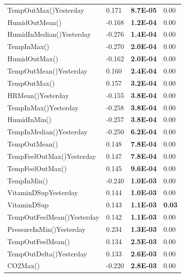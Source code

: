 \documentclass[conference]{IEEEtran}
\begin{document}
\begin{table}[]
\begin{tabular}{llll}
TempOutMax()Yesterday          & 0.171  & \textbf{8.7E-05} & 0.00           \\
HumidOutMean()                 & -0.168 & \textbf{1.2E-04} & 0.00           \\
HumidInMedian()Yesterday       & -0.276 & \textbf{1.4E-04} & 0.00           \\
TempInMax()                    & -0.270 & \textbf{2.0E-04} & 0.00           \\
HumidOutMax()                  & -0.162 & \textbf{2.0E-04} & 0.00           \\
TempOutMean()Yesterday         & 0.160  & \textbf{2.4E-04} & 0.00           \\
TempOutMax()                   & 0.157  & \textbf{3.2E-04} & 0.00           \\
HRMean()Yesterday              & -0.155 & \textbf{3.8E-04} & 0.00           \\
TempInMax()Yesterday           & -0.258 & \textbf{3.8E-04} & 0.00           \\
HumidInMin()                   & -0.257 & \textbf{3.8E-04} & 0.00           \\
TempInMedian()Yesterday        & -0.250 & \textbf{6.2E-04} & 0.00           \\
TempOutMean()                  & 0.148  & \textbf{7.8E-04} & 0.00           \\
TempFeelOutMax()Yesterday      & 0.147  & \textbf{7.8E-04} & 0.00           \\
TempFeelOutMax()               & 0.145  & \textbf{9.6E-04} & 0.00           \\
TempInMin()                    & -0.240 & \textbf{1.0E-03} & 0.00           \\
VitaminDSupYesterday           & 0.144  & \textbf{1.0E-03} & 0.00           \\
VitaminDSup                    & 0.143  & \textbf{1.1E-03} & \textbf{0.03}  \\
TempOutFeelMean()Yesterday     & 0.142  & \textbf{1.1E-03} & 0.00           \\
PressureInMin()Yesterday       & 0.234  & \textbf{1.3E-03} & 0.00           \\
TempOutFeelMean()              & 0.134  & \textbf{2.5E-03} & 0.00           \\
TempOutDelta()Yesterday        & 0.133  & \textbf{2.6E-03} & 0.00           \\
CO2Max()                       & -0.220 & \textbf{2.8E-03} & 0.00           \\

\end{tabular}
\end{table}
\end{document}
